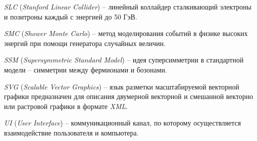 \textit{SLC} (\textit{Stanford Linear Collider}) -- линейный коллайдер сталкивающий электроны и позитроны каждый с энергией до 50 ГэВ.

\textit{SMC} (\textit{Shower Monte Carlo}) -- метод моделирования событий в физике высоких энергий при помощи генератора случайных величин.

\textit{SSM} (\textit{Supersymmetric Standard
Model}) -- идея суперсимметрии в стандартной модели -- симметрии между фермионами и бозонами. 

\textit{SVG} (\textit{Scalable Vector Graphics}) -- язык разметки масштабируемой векторной графики предназначен для описания двумерной векторной и смешанной векторно или растровой графики в формате \textit{XML}.

\textit{UI} (\textit{User Interface}) -- коммуникационный канал, по которому осуществляется взаимодействие пользователя и компьютера.

